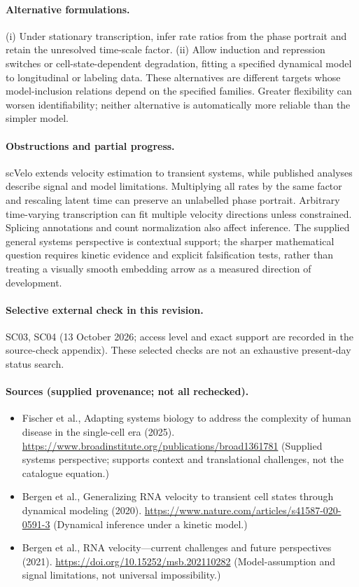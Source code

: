\documentclass[11pt]{article}
\begin{document}
\paragraph{Alternative formulations.} (i) Under stationary transcription, infer rate ratios from the phase portrait and retain the unresolved time-scale factor. (ii) Allow induction and repression switches or cell-state-dependent degradation, fitting a specified dynamical model to longitudinal or labeling data. These alternatives are different targets whose model-inclusion relations depend on the specified families. Greater flexibility can worsen identifiability; neither alternative is automatically more reliable than the simpler model.
\paragraph{Obstructions and partial progress.} scVelo extends velocity estimation to transient systems, while published analyses describe signal and model limitations. Multiplying all rates by the same factor and rescaling latent time can preserve an unlabelled phase portrait. Arbitrary time-varying transcription can fit multiple velocity directions unless constrained. Splicing annotations and count normalization also affect inference. The supplied general systems perspective is contextual support; the sharper mathematical question requires kinetic evidence and explicit falsification tests, rather than treating a visually smooth embedding arrow as a measured direction of development.
\paragraph{Selective external check in this revision.} SC03, SC04 (13 October 2026; access level and exact support are recorded in the source-check appendix). These selected checks are not an exhaustive present-day status search.

\paragraph{Sources (supplied provenance; not all rechecked).}
\begin{itemize}
\item Fischer et al., Adapting systems biology to address the complexity of human disease in the single-cell era (2025). \url{https://www.broadinstitute.org/publications/broad1361781} (Supplied systems perspective; supports context and translational challenges, not the catalogue equation.)
\item Bergen et al., Generalizing RNA velocity to transient cell states through dynamical modeling (2020). \url{https://www.nature.com/articles/s41587-020-0591-3} (Dynamical inference under a kinetic model.)
\item Bergen et al., RNA velocity---current challenges and future perspectives (2021). \url{https://doi.org/10.15252/msb.202110282} (Model-assumption and signal limitations, not universal impossibility.)
\end{itemize}
\end{document}
